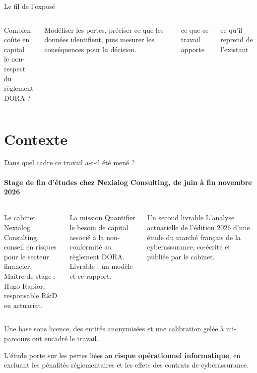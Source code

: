\documentclass[aspectratio=169,10pt,t]{beamer}
\begin{document}
\begin{frame}{Le fil de l'exposé}
  \vspace{4mm}
  \begin{columns}[T]
    \large\tableofcontents
    {\editorial\fontsize{20}{23}\selectfont Combien coûte en capital\\le non-respect\\du règlement DORA ?}\par\vspace{5mm}
    \footnotesize Modéliser les pertes, préciser ce que les données identifient,
    puis mesurer les conséquences pour la décision.\par\vspace{5mm}
    \ajout ce que ce travail apporte\par\vspace{1.5mm}
    \etabli ce qu'il reprend de l'existant
  \end{columns}
\end{frame}

\section{Contexte}

\begin{frame}{Dans quel cadre ce travail a-t-il été mené ?}
  \framesubtitle{Stage de fin d'études chez Nexialog Consulting, de juin à fin novembre 2026}
  \begin{columns}[T]
    \begin{block}{Le cabinet}
      \small Nexialog Consulting, conseil en risques pour le secteur financier.\\[1mm]
      Maître de stage : Hugo Rapior, responsable R\&D en actuariat.
    \end{block}
    \begin{alertblock}{La mission}
      \small Quantifier le besoin de capital associé à la non-conformité au règlement DORA.\\[1mm]
      Livrable : un modèle et ce rapport.
    \end{alertblock}
    \begin{block}{Un second livrable}
      \small L'analyse actuarielle de l'édition 2026 d'une étude du marché français de la cyberassurance,
      co-écrite et publiée par le cabinet.
    \end{block}
  \end{columns}
  \vspace{4mm}
  \small Une base sous licence, des entités anonymisées et une calibration gelée à mi-parcours ont encadré le travail.\par\vspace{3mm}
  \small L'étude porte sur les pertes liées au \textbf{risque opérationnel informatique}, en excluant les pénalités réglementaires et les effets des contrats de cyberassurance.
\end{frame}
\end{document}
